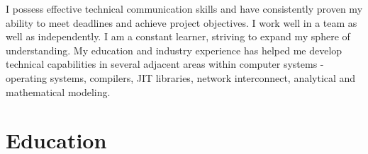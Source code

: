\documentclass[a4paper,10pt]{article} %
\begin{document}
I possess effective technical communication skills and have consistently proven my ability to meet deadlines and achieve project objectives. I work well in a team as well as independently. I am a constant learner, striving to expand my sphere of understanding. My education and industry experience has helped me develop technical capabilities in several adjacent areas within computer systems - operating systems, compilers, JIT libraries, network interconnect, analytical and mathematical modeling. 

\vspace{0.05in}



\section{Education}
\end{document}
